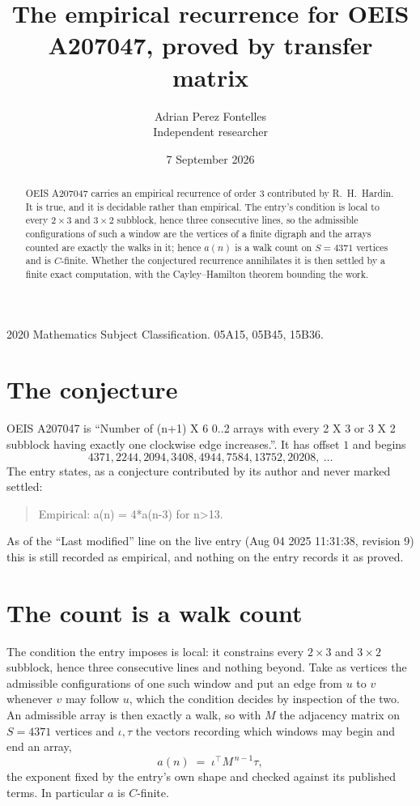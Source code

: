 \documentclass[11pt,a4paper]{article}
\title{The empirical recurrence for OEIS A207047, proved by transfer matrix}
\author{Adrian Perez Fontelles\\ \small Independent researcher}
\date{7 September 2026}
\theoremstyle{plain}
\theoremstyle{definition}
\begin{document}
\maketitle

\begin{abstract}
OEIS A207047 carries an empirical recurrence of order $3$ contributed by R.~H.~Hardin. It is
true, and it is decidable rather than empirical. The entry's condition is local to every $2\times3$ and $3\times2$ subblock, hence three consecutive lines, so
the admissible configurations of such a window are the vertices of a finite digraph and the
arrays counted are exactly the walks in it; hence $a(n)$ is a walk count on $S=4371$ vertices
and is $C$-finite. Whether the conjectured recurrence annihilates it is then settled by a
finite exact computation, with the Cayley--Hamilton theorem bounding the work.
\end{abstract}

\noindent\small 2020 Mathematics Subject Classification. 05A15, 05B45, 15B36.\normalsize

\section{The conjecture}

OEIS A207047 is ``Number of (n+1) X 6 0..2 arrays with every 2 X 3 or 3 X 2 subblock having exactly one clockwise edge increases.''. It has offset $1$ and begins
\[
4371, 2244, 2094, 3408, 4944, 7584, 13752, 20208,\ \dots
\]
The entry states, as a conjecture contributed by its author and never marked settled:
\begin{quote}
Empirical: a(n) = 4*a(n-3) for n>13.
\end{quote}
As of the ``Last modified'' line on the live entry (Aug 04 2025 11:31:38, revision 9) this is still
recorded as empirical, and nothing on the entry records it as proved.

\section{The count is a walk count}

The condition the entry imposes is local: it constrains every $2\times3$ and $3\times2$ subblock, hence three consecutive lines and nothing beyond. Take as
vertices the admissible configurations of one such window and put an edge from $u$ to $v$
whenever $v$ may follow $u$, which the condition decides by inspection of the two. An
admissible array is then exactly a walk, so with $M$ the adjacency matrix on $S=4371$ vertices
and $\iota,\tau$ the vectors recording which windows may begin and end an array,
\[
a(n)\;=\;\iota^{\!\top}M^{\,n-1}\tau ,
\]
the exponent fixed by the entry's own shape and checked against its published terms. In
particular $a$ is $C$-finite.
\end{document}
